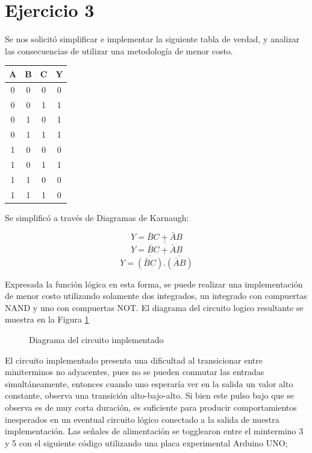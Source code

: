 \part*{Ejercicio 3}

Se nos solicitó simplificar e implementar la siguiente tabla de verdad, y analizar las consecuencias de utilizar una metodología de menor costo.

\begin{center}
\begin{tabular}{ccc|c}
A & B & C & Y \\ 
\hline
0 & 0 & 0 & 0 \\  
0 & 0 & 1 & 1 \\  
0 & 1 & 0 & 1 \\  
0 & 1 & 1 & 1 \\  
1 & 0 & 0 & 0 \\  
1 & 0 & 1 & 1 \\  
1 & 1 & 0 & 0 \\  
1 & 1 & 1 & 0 \\  
\end{tabular} 
\end{center}

Se simplificó a través de Diagramas de Karnaugh:

\begin{center}
\begin{Karnaughvuit}
   \indeterminats{}
\end{Karnaughvuit}
\end{center}

\[Y = \bar{B}C + \bar{A}B \]
\[Y = \overline{\overline{\bar{B}C + \bar{A}B}} \]
\[Y = \overline{\overline{(\bar{B}C)}.\overline{(\bar{A}B)}} \]

Expresada la función lógica en esta forma, se puede realizar una implementación de menor costo utilizando solamente dos integrados, un integrado con compuertas NAND y uno con compuertas NOT. El diagrama del circuito logico resultante se muestra en la Figura \ref{3_fig1}

\begin{figure}[H]
\begin{center}

\caption{Diagrama del circuito implementado} \label{3_fig1}
\end{center}
\end{figure}

El circuito implementado presenta una dificultad al transicionar entre miniterminos no adyacentes, pues no se pueden conmutar las entradas simultáneamente, entonces cuando uno esperaría ver en la salida un valor alto constante, observa una transición alto-bajo-alto. Si bien este pulso bajo que se observa es de muy corta duración, es suficiente para producir comportamientos inesperados en un eventual circuito lógico conectado a la salida de nuestra implementación. 
\newpage
Las señales de alimentación se togglearon entre el mintermino 3 y 5 con el siguiente código utilizando una placa experimental Arduino UNO;

